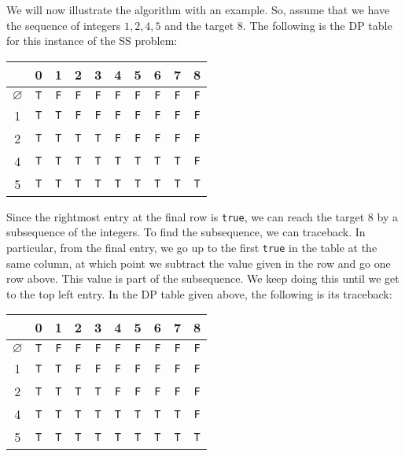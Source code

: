 \documentclass[a4paper, openany]{memoir}
\begin{document}
    We will now illustrate the algorithm with an example. So, assume that we have the sequence of integers $1, 2, 4, 5$ and the target $8$. The following is the DP table for this instance of the SS problem:
    \begin{table}[H]
        \centering
        \begin{tabular}{c|ccccccccc}
            & 0 & 1 & 2 & 3 & 4 & 5 & 6 & 7 & 8 \\
            \hline
            $\varnothing$ & \texttt{T} & \texttt{F} & \texttt{F} & \texttt{F} & \texttt{F} & \texttt{F} & \texttt{F} & \texttt{F} & \texttt{F} \\
            1 &  \texttt{T} & \texttt{T} & \texttt{F} & \texttt{F} & \texttt{F} & \texttt{F} & \texttt{F} & \texttt{F} & \texttt{F} \\
            2 & \texttt{T} & \texttt{T} & \texttt{T} & \texttt{T} & \texttt{F} & \texttt{F} & \texttt{F} & \texttt{F} & \texttt{F} \\
            4 & \texttt{T} & \texttt{T} & \texttt{T} & \texttt{T} & \texttt{T} & \texttt{T} & \texttt{T} & \texttt{T} & \texttt{F} \\
            5 & \texttt{T} & \texttt{T} & \texttt{T} & \texttt{T} & \texttt{T} & \texttt{T} & \texttt{T} & \texttt{T} & {\color{red} \texttt{T}}
        \end{tabular}
    \end{table}
    \noindent Since the rightmost entry at the final row is \texttt{true}, we can reach the target 8 by a subsequence of the integers. To find the subsequence, we can traceback. In particular, from the final entry, we go up to the first \texttt{true} in the table at the same column, at which point we subtract the value given in the row and go one row above. This value is part of the subsequence. We keep doing this until we get to the top left entry. In the DP table given above, the following is its traceback:
    \begin{table}[H]
        \centering
        \begin{tabular}{c|ccccccccc}
            & 0 & 1 & 2 & 3 & 4 & 5 & 6 & 7 & 8 \\
            \hline
            $\varnothing$ & {\color{red} \texttt{T}} & \texttt{F} & \texttt{F} & \texttt{F} & \texttt{F} & \texttt{F} & \texttt{F} & \texttt{F} & \texttt{F} \\
            {\color{red} 1} &  \texttt{T} & {\color{red} \texttt{T}} & \texttt{F} & \texttt{F} & \texttt{F} & \texttt{F} & \texttt{F} & \texttt{F} & \texttt{F} \\
            {\color{red} 2} & \texttt{T} & \texttt{T} & \texttt{T} & {\color{red} \texttt{T}} & \texttt{F} & \texttt{F} & \texttt{F} & \texttt{F} & \texttt{F} \\
            4 & \texttt{T} & \texttt{T} & \texttt{T} & {\color{red} \texttt{T}} & \texttt{T} & \texttt{T} & \texttt{T} & \texttt{T} & \texttt{F} \\
            {\color{red} 5} & \texttt{T} & \texttt{T} & \texttt{T} & \texttt{T} & \texttt{T} & \texttt{T} & \texttt{T} & \texttt{T} & {\color{red} \texttt{T}}
            \end{tabular}
    \end{table}
\end{document}
